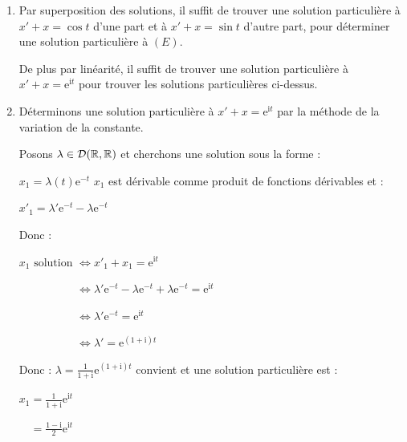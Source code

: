 \documentclass{book}
\begin{document}
\begin{Exercice}
\begin{Correction}
\begin{enumerate}
\begin{enumerate}
	\item Par superposition des solutions, il suffit de trouver une solution particulière à $x'+ x= \cos t $ d'une part et  à $x'+ x= \sin t$ d'autre part, pour déterminer une solution particulière à $(E)$.

	De plus par linéarité, il suffit de trouver une solution particulière à $x' + x = \mathrm{e}^{\mathrm{i} t}$ pour trouver les solutions particulières ci-dessus.


	\item Déterminons une solution particulière à $x' + x = \mathrm{e}^{\mathrm{i} t}$ par la méthode de la variation de la constante.

	Posons $\lambda \in \mathcal{D}(\mathbb{R} ,\mathbb{R})$ et cherchons une solution sous la forme :

		\hspace{0.7cm} $x_{1} = \lambda(t) \mathrm{e}^{-t}$  \hspace{0.5cm} $x_{1}$ est dérivable comme produit de fonctions dérivables et :

		\hspace{0.7cm} $x'_{1} = \lambda'  \mathrm{e}^{-t} - \lambda   \mathrm{e}^{-t}$

	Donc :

\hspace{0.7cm} $x_{1} \text{ solution } 
\Longleftrightarrow 
x'_{1} + x_{1} = \mathrm{e}^{\mathrm{i} t}$

\hspace{0.7cm} $\phantom{x_{1} \text{ solution } } 
\Longleftrightarrow
 \lambda'  \mathrm{e}^{-t} - \lambda   \mathrm{e}^{-t}  + 
  \lambda   \mathrm{e}^{-t} = \mathrm{e}^{\mathrm{i} t}$
 
\hspace{0.7cm} $\phantom{x_{1} \text{ solution } } 
\Longleftrightarrow
 \lambda'  \mathrm{e}^{-t} =  \mathrm{e}^{\mathrm{i} t}$
 
		  \hspace{0.7cm} $\phantom{x_{1} \text{ solution }  } \Longleftrightarrow
 \lambda' = \mathrm{e}^{ (1+\mathrm{i}) t}$
 
		 Donc : $\lambda = \tfrac{1}{1+\mathrm{i}}  \mathrm{e}^{ (1+\mathrm{i}) t}$ convient et une solution particulière est :

  		\hspace{0.7cm} $x_{1} =  \tfrac{1}{1+\mathrm{i}}  \mathrm{e}^{ \mathrm{i} t}$
  
    	\hspace{0.7cm} $\phantom{ x_{1} } =  \tfrac{1- \mathrm{i}}{2}  \mathrm{e}^{ \mathrm{i} t}$


\end{enumerate}
\end{enumerate}
\end{Correction}
\end{Exercice}
\end{document}
